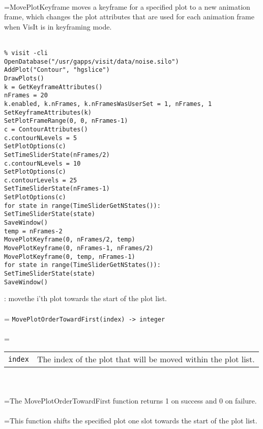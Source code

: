 \documentclass[10pt,a4paper]{report}
\begin{document}
 \\ 
\hangindent=\parindent MovePlotKeyframe moves a keyframe for a specified plot to a new animation frame, which changes the plot attributes that are used for each animation frame when VisIt is in keyframing mode. \\[-3mm] 

\\[-6mm]
\begin{verbatim}% visit -cli
OpenDatabase("/usr/gapps/visit/data/noise.silo")
AddPlot("Contour", "hgslice")
DrawPlots()
k = GetKeyframeAttributes()
nFrames = 20
k.enabled, k.nFrames, k.nFramesWasUserSet = 1, nFrames, 1
SetKeyframeAttributes(k)
SetPlotFrameRange(0, 0, nFrames-1)
c = ContourAttributes()
c.contourNLevels = 5
SetPlotOptions(c)
SetTimeSliderState(nFrames/2)
c.contourNLevels = 10
SetPlotOptions(c)
c.contourLevels = 25
SetTimeSliderState(nFrames-1)
SetPlotOptions(c)
for state in range(TimeSliderGetNStates()):
SetTimeSliderState(state)
SaveWindow()
temp = nFrames-2
MovePlotKeyframe(0, nFrames/2, temp)
MovePlotKeyframe(0, nFrames-1, nFrames/2)
MovePlotKeyframe(0, temp, nFrames-1)
for state in range(TimeSliderGetNStates()):
SetTimeSliderState(state)
SaveWindow()
\end{verbatim}
\newpage


{}
: movethe i'th plot towards the start of the plot list.\\[-3mm]

 \\ 
\hangindent=\parindent 
\verb!MovePlotOrderTowardFirst(index) -> integer!\\ [-3mm]

 \\ 
\hangindent=\parindent 
\begin{tabular}{lp{9cm}}
\verb!index! & The index of the plot that will be moved within the plot list. \\
\end{tabular} \\[-2mm]


 \\ 
\hangindent=\parindent The MovePlotOrderTowardFirst function returns 1 on success and 0 on failure. \\[-3mm] 

 \\ 
\hangindent=\parindent This function shifts the specified plot one slot towards the start of the plot list. \\[-3mm] 
\end{document}

